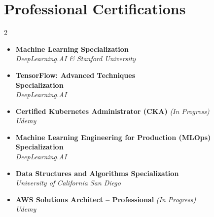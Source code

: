 \section{\Large Professional Certifications}
\setlength{\multicolsep}{0pt}
\vspace{-6pt}
\begin{multicols}{2}
\begin{itemize}[leftmargin=0.15in, label={}, topsep=0pt]
\small
\item{
\textbf{Machine Learning Specialization}
\href{https://www.coursera.org/account/accomplishments/specialization/AGM5AUMS47HP}{\color{bleudefrance}{\faExternalLink*}}\\
\textit{DeepLearning.AI \& Stanford University}
}
\vspace{3pt}

\item{
\textbf{TensorFlow: Advanced Techniques \\Specialization}
\href{https://www.coursera.org/account/accomplishments/specialization/VBXVQVU5WUXA}{\color{bleudefrance}{\faExternalLink*}}\\
\textit{DeepLearning.AI}
}
\vspace{3pt}

\item{
\textbf{Certified Kubernetes Administrator (CKA)} \textnormal{\textit{(In Progress)}}\\
\textit{Udemy}
}
\end{itemize}

\columnbreak

\begin{itemize}[leftmargin=0.15in, label={}, topsep=0pt]
\small
\item{
\textbf{Machine Learning Engineering for Production (MLOps) Specialization}
\href{https://www.coursera.org/account/accomplishments/specialization/4ANF2V92VSXZ}{\color{bleudefrance}{\faExternalLink*}}\\
\textit{DeepLearning.AI}
}
\vspace{3pt}

\item{
\textbf{Data Structures and Algorithms Specialization}\\
\textit{University of California San Diego}
}
\vspace{3pt}

\item{
\textbf{AWS Solutions Architect -- Professional} \textnormal{\textit{(In Progress)}}\\
\textit{Udemy}
}
\end{itemize}
\end{multicols}